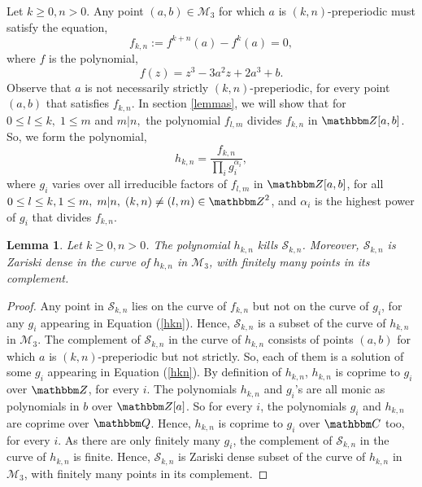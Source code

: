 \documentclass[reqno]{amsart}
\renewcommand{\eqref}[1]{(\ref{#1})}
\numberwithin{equation}{section}
\theoremstyle{plain}
\newtheorem{lemma}[theorem]{Lemma}
\theoremstyle{definition}
\theoremstyle{definition}
\newcommand{\Q}{{\mathbbm Q}}
\newcommand{\Z}{{\mathbbm Z}}
\newcommand{\C}{{\mathbbm C}}
\begin{document}
    Let $k\geq 0, n>0$. Any point $(a,b)\in \mathcal{M}_{3}$ for which $a$ is $(k,n)$-preperiodic must satisfy the equation, 
        $$f_{k,n}:= f^{k+n}(a)-f^{k}(a)=0,$$
    where $f$ is the polynomial,
    \begin{equation}\label{newmaineq}
        f(z)= z^{3} -3a^{2}z +2a^{3} +b.
    \end{equation}
    Observe that $a$ is not necessarily strictly $(k,n)$-preperiodic, for every point $(a,b)$ that satisfies $f_{k,n}$. In section \ref{lemmas}, we will show that for $0\leq l\leq k,\; 1\leq m$ and $ m|n,$ the polynomial $f_{l,m}$ divides $f_{k,n}$ in $\Z[a,b]$. So, we form the polynomial,
    \begin{equation}\label{hkn}
        h_{k,n} = \frac{f_{k,n}}{\prod_{i} g_{i}^{\alpha_{i}}},
    \end{equation}
    where $g_{i}$ varies over all irreducible factors of $f_{l,m}$ in $\Z[a,b]$, for all $0\leq l\leq k, 1\leq m,\; m|n,\; (k,n)\neq (l,m)\in \Z^{2}$, and $\alpha_{i}$ is the highest power of $g_{i}$ that divides $f_{k,n}$.
    \begin{lemma}\label{dense}
        Let $k\geq 0, n>0$. The polynomial $h_{k,n}$ kills $\mathscr{S}_{k,n}$. Moreover, $\mathscr{S}_{k,n}$ is Zariski dense in the curve of $h_{k,n}$ in $\mathcal{M}_{3}$, with finitely many points in its complement.
    \end{lemma}
    \begin{proof}
        Any point in $\mathscr{S}_{k,n}$ lies on the curve of $f_{k,n}$ but not on the curve of $g_{i}$, for any $g_{i}$ appearing in Equation \eqref{hkn}. Hence, $\mathscr{S}_{k,n}$ is a subset of the curve of $h_{k,n}$ in $\mathcal{M}_{3}$. The complement of $\mathscr{S}_{k,n}$ in the curve of $h_{k,n}$ consists of points $(a,b)$ for which $a$ is $(k,n)$-preperiodic but not strictly. So, each of them is a solution of some $g_{i}$ appearing in Equation \eqref{hkn}. By definition of $h_{k,n}$, $h_{k,n}$ is coprime to $g_{i}$ over $\Z$, for every $i$. The polynomials $h_{k,n}$ and $g_{i}$'s are all monic as polynomials in $b$ over $\Z[a]$. So for every $i$, the polynomials $g_{i}$ and $h_{k,n}$ are coprime over $\Q$. Hence, $h_{k,n}$ is coprime to $g_{i}$ over $\C$ too, for every $i$. As there are only finitely many $g_{i}$, the complement of $\mathscr{S}_{k,n}$ in the curve of $h_{k,n}$ is finite. Hence, $\mathscr{S}_{k,n}$ is Zariski dense subset of the curve of $h_{k,n}$ in $\mathcal{M}_{3}$, with finitely many points in its complement.
    \end{proof}
\end{document}
